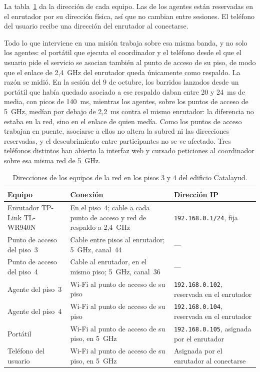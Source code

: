 La tabla~\ref{tab:direcciones-red} da la dirección de cada equipo. Las de los agentes están reservadas en el
enrutador por su dirección física, así que no cambian entre sesiones. El teléfono del usuario recibe una dirección del enrutador al
conectarse.

Todo lo que interviene en una misión trabaja sobre esa misma banda, y no solo los agentes: el portátil que ejecuta el coordinador y
el teléfono desde el que el usuario pide el servicio se asocian también al punto de acceso de su piso, de modo que el enlace de
2,4~GHz del enrutador queda únicamente como respaldo. La razón se midió. En la sesión del 9 de octubre, los barridos lanzados desde
un portátil que había quedado asociado a ese respaldo daban entre 20 y 24~ms de media, con picos de 140~ms, mientras los agentes,
sobre los puntos de acceso de 5~GHz, medían por debajo de 2,2~ms contra el mismo enrutador: la diferencia no estaba en la red, sino
en el enlace de quien medía. Como los puntos de acceso trabajan en puente, asociarse a ellos no altera la subred ni las direcciones
reservadas, y el descubrimiento entre participantes no se ve afectado. Tres teléfonos distintos han abierto la interfaz web y cursado
peticiones al coordinador sobre esa misma red de 5~GHz.

\begin{table}[H]
  \centering\footnotesize
  \caption{Direcciones de los equipos de la red en los pisos 3 y 4 del edificio Catalayud.}
  \label{tab:direcciones-red}
  \begin{tabular}{@{}>{\raggedright\arraybackslash}p{}>{\raggedright\arraybackslash}p{}>{\raggedright\arraybackslash}p{}@{}}
    \toprule
    \textbf{Equipo} & \textbf{Conexión} & \textbf{Dirección IP} \\ \midrule
    Enrutador TP-Link \mbox{TL-WR940N} & En el piso~4; cable a cada punto de acceso y red de respaldo a 2,4~GHz & \texttt{192.168.0.1/24}, fija \\ \addlinespace
    Punto de acceso del piso~3 & Cable entre pisos al enrutador; 5~GHz, canal~44 & --- \\ \addlinespace
    Punto de acceso del piso~4 & Cable al enrutador, en el mismo piso; 5~GHz, canal~36 & --- \\ \addlinespace
    Agente del piso~3 & Wi-Fi al punto de acceso de su piso & \texttt{192.168.0.102}, reservada en el enrutador \\ \addlinespace
    Agente del piso~4 & Wi-Fi al punto de acceso de su piso & \texttt{192.168.0.104}, reservada en el enrutador \\ \addlinespace
    Portátil & Wi-Fi al punto de acceso de su piso, en 5~GHz & \texttt{192.168.0.105}, asignada por el enrutador \\ \addlinespace
    Teléfono del usuario & Wi-Fi al punto de acceso de su piso, en 5~GHz & Asignada por el enrutador al conectarse \\ \bottomrule
  \end{tabular}
\end{table}


